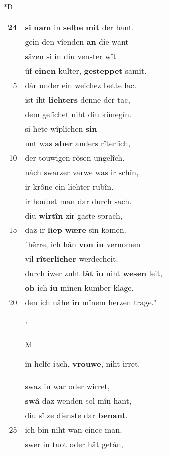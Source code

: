 \documentclass[8pt,a4paper,notitlepage]{article}
\begin{document}
\begin{table}[ht]
\begin{minipage}[t]{0.5\linewidth}
\small
\begin{center}*D
\end{center}
\begin{tabular}{rl}
\textbf{24} & \textbf{si} \textbf{nam} in \textbf{selbe} \textbf{mit} der hant.\\ 
 & gein den vîenden \textbf{an} die want\\ 
 & sâzen si in diu venster wît\\ 
 & ûf \textbf{einen} kulter, \textbf{gesteppet} samît.\\ 
5 & dâr under ein weichez bette lac.\\ 
 & ist iht \textbf{liehters} denne der tac,\\ 
 & dem gelîchet niht diu künegîn.\\ 
 & si hete wîplîchen \textbf{sin}\\ 
 & unt was \textbf{aber} anders rîterlîch,\\ 
10 & der touwigen rôsen ungelîch.\\ 
 & nâch swarzer varwe was ir schîn,\\ 
 & ir krône ein liehter rubîn.\\ 
 & ir houbet man dar durch sach.\\ 
 & diu \textbf{wirtîn} zir gaste sprach,\\ 
15 & daz ir \textbf{liep wære} sîn komen.\\ 
 & "hêrre, ich hân \textbf{von iu} vernomen\\ 
 & vil \textbf{rîterlîcher} werdecheit.\\ 
 & durch iwer zuht \textbf{lât} \textbf{iu} niht \textbf{wesen} leit,\\ 
 & \textbf{ob} ich \textbf{iu} mînen kumber klage,\\ 
20 & den ich nâhe \textbf{in} mînem herzen trage."\\ 
 & "\begin{large}M\end{large}în helfe i\textit{u}ch, \textbf{vrouwe}, niht irret.\\ 
 & swaz iu war oder wirret,\\ 
 & \textbf{swâ} daz wenden sol mîn hant,\\ 
 & diu sî ze dienste dar \textbf{benant}.\\ 
25 & ich bin niht wan einec man.\\ 
 & swer iu tuot oder hât getân,\\ 

\end{tabular}
\end{minipage}
\end{table}
\end{document}
